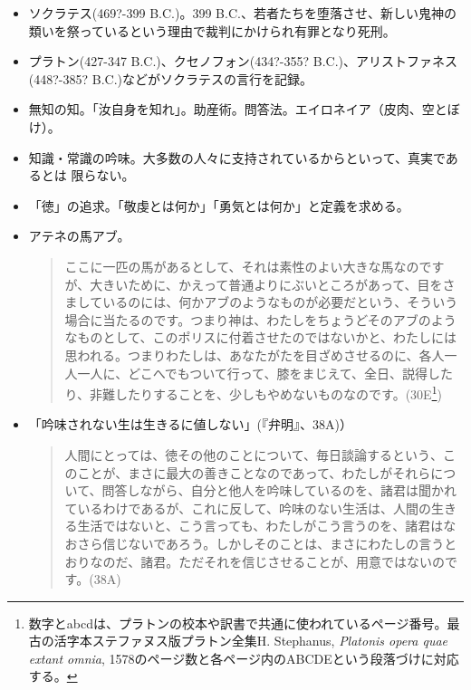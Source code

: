 \documentclass[uplatex]{bxjsarticle}
\begin{document}
\begin{itemize}


\item ソクラテス(469?-399 B.C.)。399 B.C.、若者たちを堕落させ、新しい鬼神の類いを祭っているという理由で裁判にかけられ有罪となり死刑。

\item プラトン(427-347 B.C.)、クセノフォン(434?-355? B.C.)、アリストファネス(448?-385? B.C.)などがソクラテスの言行を記録。

\item 無知の知。「汝自身を知れ」。助産術。問答法。エイロネイア（皮肉、空とぼけ）。

\item 知識・常識の吟味。大多数の人々に支持されているからといって、真実であるとは
限らない。

\item 「徳」の追求。「敬虔とは何か」「勇気とは何か」と定義を求める。


\item アテネの馬アブ。
  \begin{quote}
    ここに一匹の馬があるとして、それは素性のよい大きな馬なのですが、大きいために、かえって普通よりにぶいところがあって、目をさましているのには、何かアブのようなものが必要だという、そういう場合に当たるのです。つまり神は、わたしをちょうどそのアブのようなものとして、このポリスに付着させたのではないかと、わたしには思われる。つまりわたしは、あなたがたを目ざめさせるのに、各人一人一人に、どこへでもついて行って、膝をまじえて、全日、説得したり、非難したりすることを、少しもやめないものなのです。(30E\footnote{数字とabcdは、プラトンの校本や訳書で共通に使われているページ番号。最古の活字本ステファヌス版プラトン全集H. Stephanus, \emph{Platonis opera quae extant omnia}, 1578のページ数と各ページ内のABCDEという段落づけに対応する。})
  \end{quote}


\item 「吟味されない生は生きるに値しない」(『弁明』、38A)）

  \begin{quote}
    人間にとっては、徳その他のことについて、毎日談論するという、このことが、まさに最大の善きことなのであって、わたしがそれらについて、問答しながら、自分と他人を吟味しているのを、諸君は聞かれているわけであるが、これに反して、吟味のない生活は、人間の生きる生活ではないと、こう言っても、わたしがこう言うのを、諸君はなおさら信じないであろう。しかしそのことは、まさにわたしの言うとおりなのだ、諸君。ただそれを信じさせることが、用意ではないのです。(38A)
  \end{quote}



\end{itemize}
\end{document}
